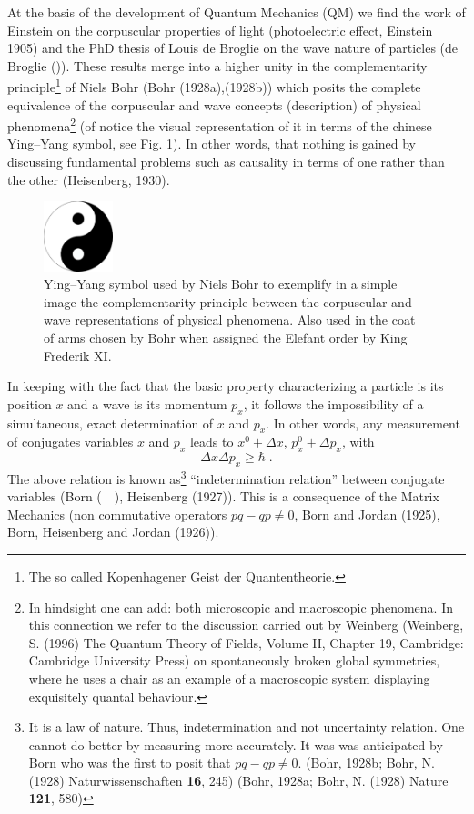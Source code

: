\documentclass[a4paper,onecolumn,superscriptaddress,12pt,nofootinbib,twoside,raggedfooter,notitlepage]{revtex4-1}
\begin{document}
At the basis of the development of Quantum Mechanics (QM) we find the work of Einstein on the corpuscular properties of light (photoelectric effect, Einstein 1905) and the PhD thesis of Louis de Broglie on the wave nature of particles (de Broglie (\quad)). These results merge into a higher unity in the complementarity principle\footnote{The so called Kopenhagener Geist der Quantentheorie.} of Niels Bohr (Bohr (1928a),(1928b)) which posits the complete equivalence of the corpuscular and wave concepts (description) of physical phenomena\footnote{In hindsight one can add: both microscopic and  macroscopic phenomena. In this connection we refer to the discussion carried out by Weinberg (Weinberg, S. (1996) The Quantum Theory of Fields, Volume II, Chapter 19, Cambridge: Cambridge University Press) on spontaneously broken global symmetries, where he uses a chair as an example of a macroscopic system displaying exquisitely quantal behaviour.} (of notice the visual representation of it in terms of the chinese Ying--Yang symbol, see Fig. 1). In other words, that nothing is gained by discussing fundamental problems such as causality in terms of one rather than the other (Heisenberg, 1930).
\begin{figure}[htb!]
	\begin{center}
		\includegraphics[width=0.18\textwidth]{figs/fig_1}
		\caption{Ying--Yang symbol used by Niels Bohr to exemplify in a simple image the complementarity principle between the corpuscular and wave representations of physical phenomena. Also used in the coat of arms chosen by Bohr when assigned the Elefant order by King Frederik XI.}
	\end{center}
\end{figure}

In keeping with the fact that the basic property characterizing a particle is its position $x$ and a wave is its momentum $p_x$, it follows the impossibility of a simultaneous, exact determination of $x$ and $p_x$. In other words, any measurement of conjugates variables $x$ and $p_x$ leads to  $x^0 + \Delta x$, $p_x^0 + \Delta p_x$, with
$$ \Delta x \Delta p_x \geq \hbar \;.$$
The above relation is known as\footnote{It is a law of nature. Thus, indetermination and not uncertainty relation. One cannot do better by measuring more accurately. It was was anticipated by Born who was the first to posit that $pq - qp \neq 0$. (Bohr, 1928b; Bohr, N. (1928) Naturwissenschaften \textbf{16}, 245) (Bohr, 1928a; Bohr, N. (1928) Nature \textbf{121}, 580)} ``indetermination relation'' between conjugate variables (Born ($\quad$), Heisenberg (1927)). This is a consequence of the Matrix Mechanics (non commutative operators $pq - qp \neq 0$, Born and Jordan (1925), Born, Heisenberg and Jordan (1926)).
\end{document}
